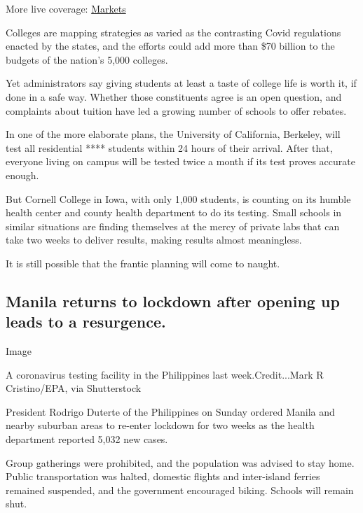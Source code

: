 More live coverage:
\href{https://www.nytimes.com/live/2020/08/04/business/stock-market-today-coronavirus?action=click\&pgtype=Article\&state=default\&region=MAIN_CONTENT_1\&context=storylines_live_updates}{Markets}

Colleges are mapping strategies as varied as the contrasting Covid
regulations enacted by the states, and the efforts could add more than
\$70 billion to the budgets of the nation's 5,000 colleges.

Yet administrators say giving students at least a taste of college life
is worth it, if done in a safe way. Whether those constituents agree is
an open question, and complaints about tuition have led a growing number
of schools to offer rebates.

In one of the more elaborate plans, the University of California,
Berkeley, will test all residential **** students within 24 hours of
their arrival. After that, everyone living on campus will be tested
twice a month if its test proves accurate enough.

But Cornell College in Iowa, with only 1,000 students, is counting on
its humble health center and county health department to do its testing.
Small schools in similar situations are finding themselves at the mercy
of private labs that can take two weeks to deliver results, making
results almost meaningless.

It is still possible that the frantic planning will come to naught.

\hypertarget{manila-returns-to-lockdown-after-opening-up-leads-to-a-resurgence}{%
\subsection{Manila returns to lockdown after opening up leads to a
resurgence.}\label{manila-returns-to-lockdown-after-opening-up-leads-to-a-resurgence}}

Image

A coronavirus testing facility in the Philippines last
week.Credit...Mark R Cristino/EPA, via Shutterstock

President Rodrigo Duterte of the Philippines on Sunday ordered Manila
and nearby suburban areas to re-enter lockdown for two weeks as the
health department reported 5,032 new cases.

Group gatherings were prohibited, and the population was advised to stay
home. Public transportation was halted, domestic flights and
inter-island ferries remained suspended, and the government encouraged
biking. Schools will remain shut.

